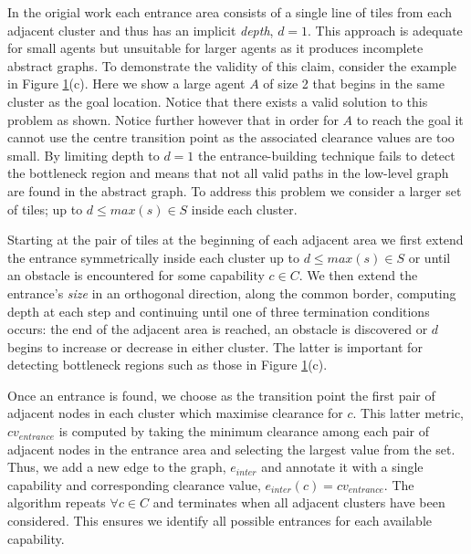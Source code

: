 {\begin{figure}[htbp]
\begin{center}
        \end{center}
        \label{aha-fig:clustersandentrances}
\end{figure}
\par \indent
In the origial work each entrance area consists of a single line of tiles from each adjacent cluster and thus has an implicit \emph{depth}, $d = 1$.
This approach is adequate for small agents but unsuitable for larger agents as it produces incomplete abstract graphs. 
To demonstrate the validity of this claim, consider the example in Figure \ref{aha-fig:clustersandentrances}(c). 
Here we show a large agent $A$ of size 2 that begins in the same cluster as the goal location. 
Notice that there exists a valid solution to this problem as shown. 
Notice further however that in order for $A$ to reach the goal it cannot use the centre transition point as the associated clearance values are too small.
By limiting depth to $d = 1$ the entrance-building technique fails to detect the bottleneck region and means that not all valid paths in the low-level graph are found in the abstract graph.
To address this problem we consider a larger set of tiles; up to $d \leq max(s) \in S$  inside each cluster.
\par \indent
Starting at the pair of tiles at the beginning of each adjacent area we first extend the entrance symmetrically inside each cluster up to $d \leq max(s) \in S$ or until an obstacle is encountered for some capability $c \in C$.
We then extend the entrance's \emph{size} in an orthogonal direction, along the common border, computing depth at each step and continuing until one of three termination conditions occurs: the end of the adjacent area is reached, an obstacle is discovered or $d$ begins to increase or decrease in either cluster. 
The latter is important for detecting bottleneck regions such as those in Figure \ref{aha-fig:clustersandentrances}(c).
\par \indent
Once an entrance is found, we choose as the transition point the first pair of adjacent nodes in each cluster which maximise clearance for $c$.
This latter metric, $cv_{entrance}$ is computed by taking the minimum clearance among each pair of adjacent nodes in the entrance area and selecting the largest value from the set. 
Thus, we add a new edge to the graph, $e_{inter}$ and annotate it with a single capability and corresponding clearance value, $e_{inter}(c) = cv_{entrance}$. 
The algorithm repeats $\forall c \in C$ and terminates when all adjacent clusters have been considered. 
This ensures we identify all possible entrances for each available capability.
}
